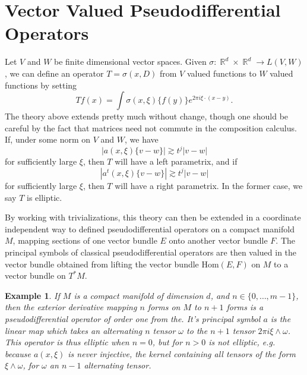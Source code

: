 \documentclass{article}
\DeclareMathOperator{\RR}{\mathbb{R}}
\theoremstyle{plain}
\newtheorem*{example}{Example}
\theoremstyle{definition}
\begin{document}
\section{Vector Valued Pseudodifferential Operators}

Let $V$ and $W$ be finite dimensional vector spaces. Given $\sigma: \RR^d \times \RR^d \to L(V,W)$, we can define an operator $T = \sigma(x,D)$ from $V$ valued functions to $W$ valued functions by setting
%
\[ Tf(x) = \int \sigma(x,\xi) \{ f(y) \} e^{2 \pi i \xi \cdot (x - y)}. \]
%
The theory above extends pretty much without change, though one should be careful by the fact that matrices need not commute in the composition calculus. If, under some norm on $V$ and $W$, we have
%
\[ |a(x,\xi) \{ v - w \}| \gtrsim t^j |v - w| \]
%
for sufficiently large $\xi$, then $T$ will have a left parametrix, and if
%
\[ |a^t(x,\xi) \{ v - w \}| \gtrsim t^j |v - w| \]
%
for sufficiently large $\xi$, then $T$ will have a right parametrix. In the former case, we say $T$ is elliptic.

By working with trivializations, this theory can then be extended in a coordinate independent way to defined pseudodifferential operators on a compact manifold $M$, mapping sections of one vector bundle $E$ onto another vector bundle $F$. The principal symbols of classical pseudodifferential operators are then valued in the vector bundle obtained from lifting the vector bundle $\text{Hom}(E,F)$ on $M$ to a vector bundle on $T^* M$.

\begin{example}
    If $M$ is a compact manifold of dimension $d$, and $n \in \{ 0, \dots, m-1 \}$, then the exterior derivative mapping $n$ forms on $M$ to $n+1$ forms is a pseudodifferential operator of order one from the. It's principal symbol $a$ is the linear map which takes an alternating $n$ tensor $\omega$ to the $n+1$ tensor $2 \pi i \xi \wedge \omega$. This operator is thus \emph{elliptic} when $n = 0$, but for $n > 0$ is not elliptic, e.g. because $a(x,\xi)$ is never injective, the kernel containing all tensors of the form $\xi \wedge \omega$, for $\omega$ an $n-1$ alternating tensor.
\end{example}
\end{document}
